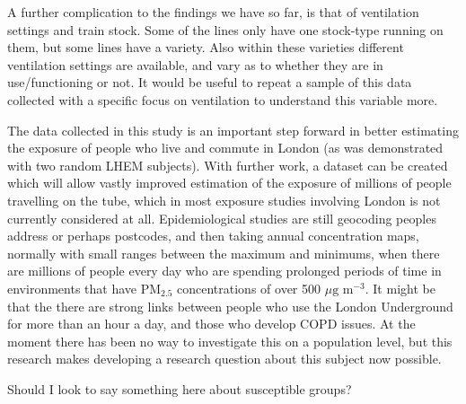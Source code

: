 A further complication to the findings we have so far, is that of ventilation settings and train stock. Some of the lines only have one stock-type running on them, but some lines have a variety. Also within these varieties different ventilation settings are available, and vary as to whether they are in use/functioning or not. It would be useful to repeat a sample of this data collected with a specific focus on ventilation to understand this variable more.

The data collected in this study is an important step forward in better estimating the exposure of people who live and commute in London (as was demonstrated with two random LHEM subjects). With further work, a dataset can be created which will allow vastly improved estimation of the exposure of millions of people travelling on the tube, which in most exposure studies involving London is not currently considered at all. Epidemiological studies are still geocoding peoples address or perhaps postcodes, and then taking annual concentration maps, normally with small ranges between the maximum and minimums, when there are millions of people every day who are spending prolonged periods of time in environments that have PM$_{2.5}$ concentrations of over 500 $\mu \text{g m}^{-3}$. It might be that the there are strong links between people who use the London Underground for more than an hour a day, and those who develop COPD issues. At the moment there has been no way to investigate this on a population level, but this research makes developing a research question about this subject now possible.

Should I look to say something here about susceptible groups?


